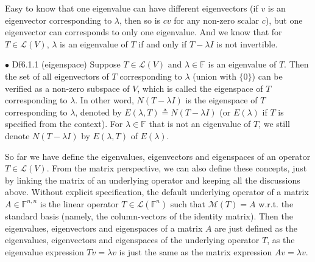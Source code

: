 \documentclass{article}
\begin{document}
\begin{Rmk}{}
    Easy to know that \textcolor{Th}{one eigenvalue can have different eigenvectors (if $v$ is an eigenvector corresponding to $\lambda$, then so is $cv$ for any non-zero scalar $c$), but one eigenvector can corresponds to only one eigenvalue.} And we know that \textcolor{Th}{for $T\in\mathcal{L}(V)$, $\lambda$ is an eigenvalue of $T$ if and only if $T-\lambda I$ is not invertible.}
\end{Rmk}

\begin{Df}{$\bullet$ Df6.1.1 (eigenspace)}
    Suppose $T\in\mathcal{L}(V)$ and $\lambda\in\mathbb{F}$ is an eigenvalue of $T$. \textcolor{Th}{Then the set of all eigenvectors of $T$ corresponding to $\lambda$ (union with $\{0\}$) can be verified as a non-zero subspace of $V$}, which is called the eigenspace of $T$ corresponding to $\lambda$. In other word, $N(T-\lambda I)$ is the eigenspace of $T$ corresponding to $\lambda$, denoted by $E(\lambda, T)\triangleq N(T-\lambda I)$ (or $E(\lambda)$ if $T$ is specified from the context). \textcolor{Df}{For $\lambda\in\mathbb{F}$ that is not an eigenvalue of $T$, we still denote $N(T-\lambda I)$ by $E(\lambda, T)$ of $E(\lambda)$.}
\end{Df}

\begin{Rmk}{}
    So far we have define the eigenvalues, eigenvectors and eigenspaces of an operator $T\in\mathcal{L}(V)$. From the matrix perspective, we can also define these concepts, just by linking the matrix of an underlying operator and keeping all the discussions above. \textcolor{Df}{Without explicit specification, the default underlying operator of a matrix $A\in\mathbb{F}^{n,n}$ is the linear operator $T\in\mathcal{L}(\mathbb{F}^n)$ such that $\mathcal{M}(T)=A$ w.r.t. the standard basis (namely, the column-vectors of the identity matrix). Then the eigenvalues, eigenvectors and eigenspaces of a matrix $A$ are just defined as the eigenvalues, eigenvectors and eigenspaces of the underlying operator $T$,} as the eigenvalue expression $Tv=\lambda v$ is just the same as the matrix expression $Av=\lambda v$.
\end{Rmk}
\end{document}
